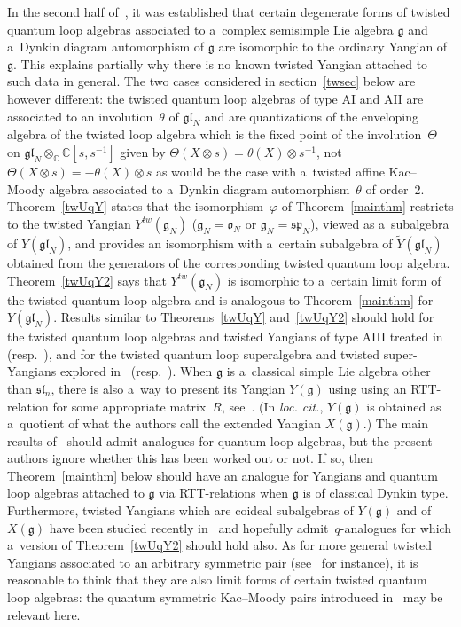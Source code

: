 \documentclass[pdftex]{sigma}
\numberwithin{theorem}{section}
\numberwithin{proposition}{section}
\numberwithin{lemma}{section}
\numberwithin{corollary}{section}
\numberwithin{definition}{section}
\numberwithin{example}{section}
\numberwithin{remark}{section}
\numberwithin{note}{section}
\numberwithin{equation}{section}
\begin{document}
In the second half of~\cite{GuMa}, it was established that certain degenerate forms of twisted quantum loop algebras
associated to a~complex semisimple Lie algebra $\mathfrak{g}$ and a~Dynkin diagram automorphism of $\mathfrak{g}$ are
isomorphic to the ordinary Yangian of $\mathfrak{g}$.
This explains partially why there is no known twisted Yangian attached to such data in general.
The two cases considered in section~\ref{twsec} below are however dif\/ferent: the twisted quantum loop algebras of type
AI and AII are associated to an involution~$\theta$ of $\mathfrak{gl}_N$ and are quantizations of the
enveloping algebra of the twisted loop algebra which is the f\/ixed point of the involution~$\Theta$ on
$\mathfrak{gl}_N\otimes_{\mathbb{C}} \mathbb{C}[s,s^{-1}]$ given by $\Theta(X \otimes s) = \theta(X) \otimes
s^{-1}$, not $\Theta(X \otimes s) =-\theta(X) \otimes s$ as would be the case with a~twisted af\/f\/ine Kac--Moody algebra
associated to a~Dynkin diagram automorphism~$\theta$ of order~$2$.
Theorem~\ref{twUqY} states that the isomorphism~$\varphi$ of Theorem~\ref{mainthm} restricts to the twisted Yangian
$Y^{tw}(\mathfrak{g}_N)$ ($\mathfrak{g}_N = \mathfrak{o}_N$ or $\mathfrak{g}_N = \mathfrak{sp}_N$), viewed as
a~subalgebra of $Y(\mathfrak{gl}_N)$, and provides an isomorphism with a~certain subalgebra of
$\widetilde{Y}(\mathfrak{gl}_N)$ obtained from the generators of the corresponding twisted quantum loop
algebra.
Theorem~\ref{twUqY2} says that $Y^{tw}(\mathfrak{g}_N)$ is isomorphic to a~certain limit form of the twisted quantum
loop algebra and is analogous to Theorem~\ref{mainthm} for $Y(\mathfrak{gl}_N)$.
Results si\-mi\-lar to Theorems~\ref{twUqY} and~\ref{twUqY2} should hold for the twisted quantum loop algebras and twisted
Yangians of type AIII treated in~\cite{CGM} (resp.~\cite{MoRa}), and for the twisted quantum loop superalgebra and
twisted super-Yangians explored in~\cite{ChGu} (resp.~\cite{Na}).
When $\mathfrak{g}$ is a~classical simple Lie algebra other than $\mathfrak{s}\mathfrak{l}_n$, there is also a~way to
present its Yangian $Y(\mathfrak{g})$ using using an RTT-relation for some appropriate matrix~$R$, see~\cite{AMR}.
(In \textit{loc.
cit.}, $Y(\mathfrak{g})$ is obtained as a~quotient of what the authors call the extended Yangian $X(\mathfrak{g})$.) The
main results of~\cite{AMR} should admit analogues for quantum loop algebras, but the present authors ignore whether this
has been worked out or not.
If so, then Theorem~\ref{mainthm} below should have an analogue for Yangians and quantum loop algebras attached to
$\mathfrak{g}$ via RTT-relations when $\mathfrak{g}$ is of classical Dynkin type.
Furthermore, twisted Yangians which are coideal subalgebras of $Y(\mathfrak{g})$ and of $X(\mathfrak{g})$ have been
studied recently in~\cite{GuRe} and hopefully admit~$q$-analogues for which a~version of Theorem~\ref{twUqY2} should
hold also.
As for more general twisted Yangians associated to an arbitrary symmetric pair (see~\cite{Ma1} for instance), it is
reasonable to think that they are also limit forms of certain twisted quantum loop algebras: the quantum symmetric
Kac--Moody pairs introduced in~\cite{Ko} may be relevant here.
\end{document}
